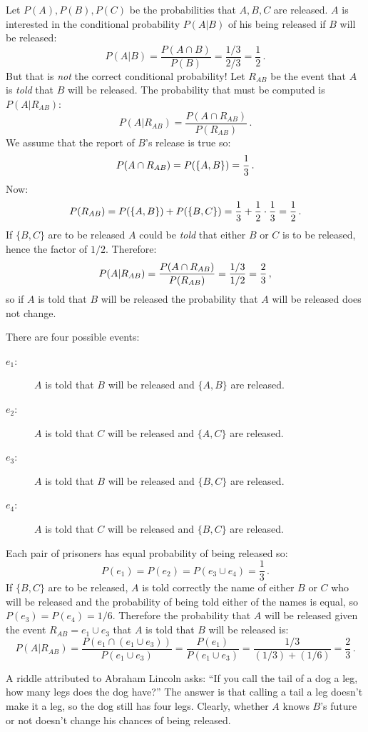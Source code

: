 
Let $P(A), P(B), P(C)$ be the probabilities that $A,B,C$ are released. $A$ is interested in the conditional probability $P(A|B)$ of his being released if $B$ will be released:
\[
P(A|B) = \frac{P(A\cap B)}{P(B)} = \frac{1/3}{2/3}=\frac{1}{2}\,.
\]
But that is \emph{not} the correct conditional probability! Let $R_{AB}$ be the event that $A$ is \emph{told} that $B$ will be released. The probability that must be computed is $P(A|R_{AB})$:
\[
P(A|R_{AB}) = \frac{P(A\cap R_{AB})}{P(R_{AB})}\,.
\]
We assume that the report of $B$'s release is true so:
\[
P(A\cap R_{AB})=P(\{A,B\})=\displaystyle\frac{1}{3}\,.
\]
Now:
\[
P(R_{AB})=P(\{A,B\})+P(\{B,C\})=\displaystyle\frac{1}{3}+\displaystyle\frac{1}{2}\cdot \displaystyle\frac{1}{3}=\displaystyle\frac{1}{2}\,.
\]
If $\{B,C\}$ are to be released $A$ could be \emph{told} that either $B$ or $C$ is to be released, hence the factor of $1/2$. Therefore:
\[
P(A|R_{AB}) = \frac{P(A\cap R_{AB})}{P(R_{AB})} = \displaystyle\frac{1/3}{1/2}=\displaystyle\frac{2}{3}\,,
\]
so if $A$ is told that $B$ will be released the probability that $A$ will be released does not change.


There are four possible events:
\begin{description}
\item[$e_1$:] $A$ is told that $B$ will be released and $\{A,B\}$ are released. 
\item[$e_2$:] $A$ is told that $C$ will be released and $\{A,C\}$ are released. 
\item[$e_3$:] $A$ is told that $B$ will be released and $\{B,C\}$ are released. 
\item[$e_4$:] $A$ is told that $C$ will be released and $\{B,C\}$ are released. 
\end{description}
Each pair of prisoners has equal probability of being released so:
\[
P(e_1)=P(e_2)=P(e_3\cup e_4)=\frac{1}{3}\,.
\]
If $\{B,C\}$ are to be released, $A$ is told correctly the name of either $B$ or $C$ who will be released and the probability of being told either of the names is equal, so $P(e_3)=P(e_4)=1/6$. Therefore the probability that $A$ will be released given the event $R_{AB}=e_1\cup e_3$ that $A$ is told that $B$ will be released is:
\[
P(A|R_{AB}) = \frac{P(e_1\cap(e_1\cup e_3))}{P(e_1\cup e_3)}=\frac{P(e_1)}{P(e_1\cup e_3)}=\frac{1/3}{(1/3)+(1/6)}=\frac{2}{3}\,.
\]

\newpage


A riddle attributed to Abraham Lincoln asks: ``If you call the tail of a dog a leg, how many legs does the dog have?'' The answer is that calling a tail a leg doesn't make it a leg, so the dog still has four legs. Clearly, whether $A$ knows $B$'s future or not doesn't change his chances of being released.

